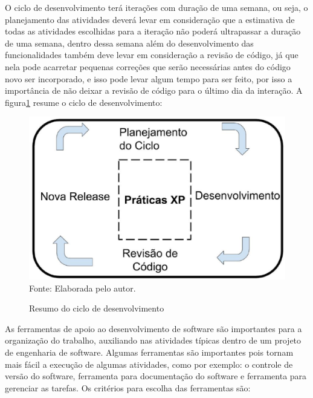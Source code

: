O ciclo de desenvolvimento terá iterações com duração de uma semana, ou seja,
o planejamento das atividades deverá levar em consideração que a
estimativa de todas as atividades escolhidas para a iteração não poderá
ultrapassar a duração de uma semana, dentro dessa semana além do desenvolvimento
das funcionalidades também deve levar em consideração a revisão de código, já que
nela pode acarretar pequenas correções que serão necessárias antes do código novo
ser incorporado, e isso pode levar algum tempo para ser feito, por isso a importância
de não deixar a revisão de código para o último dia da interação. A figura\ref{fig:def}
resume o ciclo de desenvolvimento:

\begin{figure}[h]
  \centering
  \caption{Resumo do ciclo de desenvolvimento}
  \includegraphics[width=1.0\textwidth]
      {figuras/desenvolvimento.eps}
  Fonte: Elaborada pelo autor.
\label{fig:def}
\end{figure}

As ferramentas de apoio ao desenvolvimento de software são importantes para a
organização do trabalho, auxiliando nas atividades típicas dentro de um projeto
de engenharia de software. Algumas ferramentas são importantes pois tornam mais fácil
a execução de algumas atividades, como por exemplo: o controle de versão do software,
ferramenta para documentação do software e ferramenta para gerenciar as tarefas.
Os critérios para escolha das ferramentas são:

